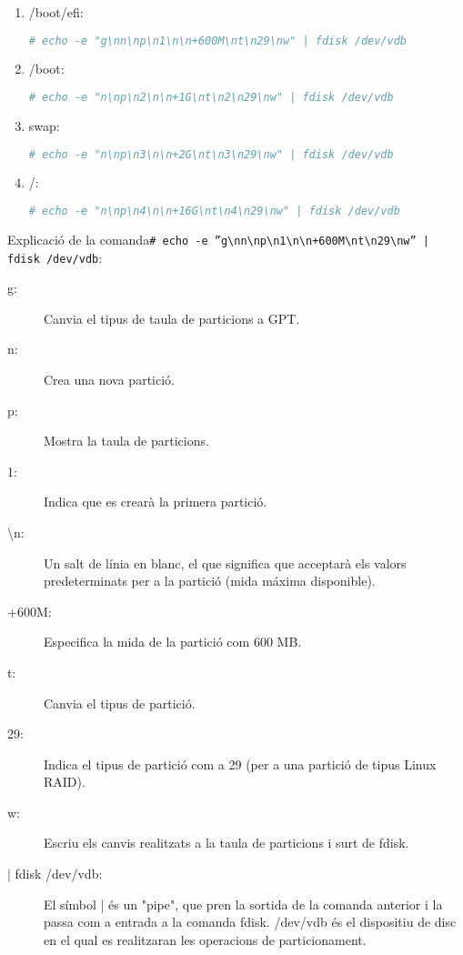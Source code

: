 \begin{enumerate}
        \item /boot/efi:
\begin{lstlisting}[language=bash, numbers=none, commentstyle=\color{black}]
# echo -e "g\nn\np\n1\n\n+600M\nt\n29\nw" | fdisk /dev/vdb
\end{lstlisting}
        \item /boot:
\begin{lstlisting}[language=bash, numbers=none, commentstyle=\color{black}]
# echo -e "n\np\n2\n\n+1G\nt\n2\n29\nw" | fdisk /dev/vdb
\end{lstlisting}
        \item swap:
\begin{lstlisting}[language=bash, numbers=none, commentstyle=\color{black}]
 # echo -e "n\np\n3\n\n+2G\nt\n3\n29\nw" | fdisk /dev/vdb
\end{lstlisting}
        \item /:
\begin{lstlisting}[language=bash, numbers=none, commentstyle=\color{black}]
# echo -e "n\np\n4\n\n+16G\nt\n4\n29\nw" | fdisk /dev/vdb
\end{lstlisting}
\end{enumerate}

Explicació de la comanda\texttt{\# echo -e ''g\textbackslash{}nn\textbackslash{}np\textbackslash{}n1\textbackslash{}n\textbackslash{}n+600M\textbackslash{}nt\textbackslash{}n29\textbackslash{}nw'' | fdisk /dev/vdb}:
\begin{description}
\item[g:] Canvia el tipus de taula de particions a GPT.
\item[n:] Crea una nova partició.
\item[p:] Mostra la taula de particions.
\item[1:] Indica que es crearà la primera partició.
\item[\textbackslash{}n:] Un salt de línia en blanc, el que significa que acceptarà els valors predeterminats per a la partició (mida máxima disponible).
\item[+600M:] Especifica la mida de la partició com 600 MB.
\item[t:] Canvia el tipus de partició.
\item[29:] Indica el tipus de partició com a 29 (per a una partició de tipus Linux RAID).
\item[w:] Escriu els canvis realitzats a la taula de particions i surt de fdisk.
\item[| fdisk /dev/vdb:] El símbol | és un "pipe", que pren la sortida de la comanda anterior i la passa com a entrada a la comanda fdisk. /dev/vdb és el dispositiu de disc en el qual es realitzaran les operacions de particionament.
\end{description}



